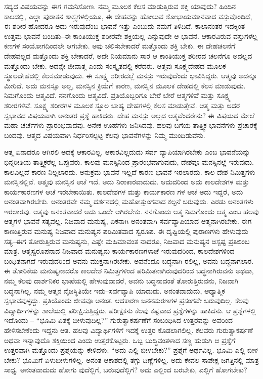 ಸದ್ಯದ ವಿಷಯವನ್ನು ಈಗ ಗಮನಿಸೋಣ. ನಮ್ಮ ಮೂಲಕ ಕೆಲಸ ಮಾಡುತ್ತಿರುವ ಶಕ್ತಿ ಯಾವುದು? ಹಿಂದಿನ ಕಾಲದಲ್ಲಿ, ಎಲ್ಲಾ ಪುರಾತನ ಶಾಸ್ತ್ರಗಳಲ್ಲಿಯೂ, ಈ ದೇಹವನ್ನು ಹೋಲುವ ಶೋಭಾಯಮಾನವಾದ ವಸ್ತುವೊಂದಿದೆ, ಈ ಶರೀರ ಹೋದರೂ ಅದು ಇರುವುದೆಂಬ ಭಾವನೆ ಇತ್ತು ಎಂಬುದು ನಮಗೆ ತಿಳಿದಿದೆ. ಕಾಲಾನಂತರ ಇದಕ್ಕಿಂತ ಉತ್ತಮ ಭಾವನೆ ಬಂದಿತು–ಈ ಕಾಂತಿಯುಕ್ತ ಶರೀರವೇ ಶಕ್ತಿಯಲ್ಲ ಎನ್ನುವುದೇ ಆ ಭಾವನೆ. ಆಕಾರವಿರುವ ವಸ್ತುಗಳೆಲ್ಲ ಕಣಗಳ ಸಂಯೋಗದಿಂದಲೇ ಆಗಬೇಕು. ಅವು ಚಲಿಸಬೇಕಾದರೆ ಮತ್ತೊಂದು ಶಕ್ತಿ ಬೇಕು. ಈ ದೇಹಚಲನೆಗೆ ದೇಹವಲ್ಲದ ಮತ್ತೊಂದು ಶಕ್ತಿ ಬೇಕಾದರೆ, ಅದೇ ನಿಯಮಾನು ಸಾರ ಆ ಕಾಂತಿಯುಕ್ತ ಶರೀರದ ಚಲನೆಗೂ ಅದಲ್ಲದ ಮತ್ತೊಂದು ಬೇಕು. ಅದನ್ನೇ ಜೀವಾತ್ಮ ಎಂದು ಸಂಸ್ಕೃತದಲ್ಲಿ ಕರೆದರು. ಆತ್ಮವು ಸೂಕ್ಷ್ಮದೇಹದ ಮೂಲಕ ಸ್ಥೂಲದೇಹದಲ್ಲಿ ಕೆಲಸಮಾಡುವುದು. ಈ ಸೂಕ್ಷ್ಮ ಶರೀರದಲ್ಲೆ ಮನಸ್ಸು ಇರುವುದೆಂದು ಭಾವಿಸಿದ್ದರು. ಆತ್ಮವು ಅದನ್ನೂ ಮೀರಿದೆ. ಅದು ಮನಸ್ಸೂ ಅಲ್ಲ, ಮನಸ್ಸಿನ ಕ್ರಿಯೆಗೆ ಕಾರಣ, ಮನಸ್ಸಿನ ಮೂಲಕ ದೇಹದಲ್ಲಿ ಕೆಲಸ ಮಾಡುವುದು. ನಿಮಗೊಂದು ಆತ್ಮವಿದೆ. ನನಗೊಂದು ಆತ್ಮವಿದೆ. ಪ್ರತಿಯೊಬ್ಬರಿಗೂ ಬೇರೆ ಬೇರೆ ಆತ್ಮಗಳಿವೆ ಮತ್ತು ಸೂಕ್ಷ್ಮ ಶರೀರಗಳಿವೆ. ಸೂಕ್ಷ್ಮ ಶರೀರಗಳ ಮೂಲಕ ಸ್ಥೂಲ ಬಾಹ್ಯ ದೇಹಗಳಲ್ಲಿ ಕೆಲಸ ಮಾಡುತ್ತೇವೆ. ಆತ್ಮ ಮತ್ತು ಅದರ ಸ್ವಭಾವದ ವಿಷಯವಾಗಿ ಅನಂತರ ಪ್ರಶ್ನೆ ಹಾಕಿದರು. ದೇಹ ಮನಸ್ಸು ಅಲ್ಲದ ಆತ್ಮವೆಂದರೇನು? ಈ ವಿಷಯದ ಮೇಲೆ ಮಹಾ ಚರ್ಚೆಗಳು ಪ್ರಾರಂಭವಾದವು. ಅನೇಕ ಊಹೆಗಳು ಜನಿಸಿದವು. ಹಲವು ಬಗೆಯ ತಾತ್ತ್ವಿಕ ಭಾವನೆಗಳು ಪ್ರಚಾರಕ್ಕೆ ಬಂದವು. ಆತ್ಮದ ವಿಷಯವಾಗಿ ನಿರ್ಧರಿಸಲ್ಪಟ್ಟ ಕೆಲವು ಭಾವನೆಗಳನ್ನು ನಿಮ್ಮ ಮುಂದಿಡುವೆನು.

ಆತ್ಮ ಏನಾದರೂ ಆಗಿರಲಿ ಅದಕ್ಕೆ ಆಕಾರವಿಲ್ಲ, ಆಕಾರವಿಲ್ಲದುದು ಸರ್ವ ವ್ಯಾಪಿಯಾಗಿರಬೇಕು ಎಂಬ ಭಾವನೆಯನ್ನು ಭಿನ್ನರೀತಿಯ ತಾತ್ತ್ವಿಕರೆಲ್ಲ ಒಪ್ಪುವರು. ಕಾಲವು ಮನಸ್ಸಿನಿಂದ ಪ್ರಾರಂಭವಾಗುವುದು, ದೇಶವೂ ಮನಸ್ಸಿನಲ್ಲೆ ಇರುವುದು. ಕಾಲವಿಲ್ಲದೆ ಕಾರಣ ನಿಲ್ಲಲಾರದು. ಅನುಕ್ರಮ ಭಾವನೆ ಇಲ್ಲದೆ ಕಾರಣ ಭಾವನೆ ಇರಲಾರದು. ಕಾಲ ದೇಶ ನಿಮಿತ್ತಗಳು ಮನಸ್ಸಿನಲ್ಲಿವೆ. ಆತ್ಮವು ಮನಸ್ಸಿನ ಆಚೆ ಇದೆ. ಅದು ನಿರಾಕಾರವಾದುದು. ಆದುದರಿಂದ ಅದು ಕಾಲದೇಶಗಳ ಮತ್ತು ಕಾರ್ಯಕಾರಣಗಳ ಆಚೆ ಇರಬೇಕಾಯಿತು. ಕಾಲದೇಶಗಳ ಮತ್ತು ಕಾರ್ಯಕಾರಣ ಗಳ ಆಚೆ ಅದು ಇದ್ದರೆ, ಅದು ಅನಂತವಾಗಿರಬೇಕು. ಅನಂತರವೇ ನಮ್ಮ ದರ್ಶನದಲ್ಲಿ ಮಹೋತ್ತುಂಗವಾದ ಕಲ್ಪನೆ ಬರುವುದು. ಎರಡು ಅನಂತಗಳು ಇರಲಾರವು. ಆತ್ಮವು ಅನಂತವಾದರೆ ಅದು ಒಂದೇ ಆಗಿರಬೇಕು. ನನಗೊಂದು ಆತ್ಮ ನಿಮಗೊಂದು ಆತ್ಮ ಎಂಬ ಹಲವು ಆತ್ಮಗಳ ಭಾವನೆ ಸತ್ಯವಲ್ಲ. ನಿಜವಾದ ಮನುಷ್ಯ, ಏಕನಾಗಿ ಅನಂತವಾಗಿ ಸರ್ವವ್ಯಾಪಿಯಾದ ಆತ್ಮನಾಗಿರಬೇಕು. ಈಗ ಕಾಣುತ್ತಿರುವ ಮನುಷ್ಯ ನಿಜವಾದ ಮನುಷ್ಯನ ಪರಿಮಿತವಾದ ಸ್ವರೂಪ. ಈ ದೃಷ್ಟಿಯಲ್ಲಿ ಪುರಾಣಗಳು ಹೇಳುವುದು ಸತ್ಯ–ಈಗ ತೋರುತ್ತಿರುವ ಮನುಷ್ಯನು, ಎಷ್ಟೇ ಮಹಿಮಾವಂತ ನಾದರೂ, ನಿಜವಾದ ಮನುಷ್ಯನ ಅಸ್ಪಷ್ಟ ಪ್ರತಿಬಿಂಬ ಮಾತ್ರ. ಆತ್ಮಸ್ವರೂಪನಾದ ನಿಜವಾದ ಮನುಷ್ಯನು ಕಾರ್ಯಕಾರಣಗಳಾಚೆ ಇರುವುದರಿಂದ, ಕಾಲದೇಶಗಳಿಂದ ಬಂಧಿತನಾಗದೆ ಇರುವುದರಿಂದ ಅವನು ಮುಕ್ತನಾಗಿರಬೇಕು. ಅವನೆಂದೂ ಬದ್ಧನಾಗಿ ರಲಿಲ್ಲ, ಅವನು ಬದ್ಧನಾಗಲಾರ. ಈ ತೋರಿಕೆಯ ಮನುಷ್ಯನಾದರೊ ಕಾಲದೇಶ ನಿಮಿತ್ತಗಳಿಂದ ಪರಿಮಿತನಾಗಿರುವುದರಿಂದ ಬದ್ಧನಾಗಿರುವನು ಅಥವಾ, ನಮ್ಮ ಕೆಲವು ದಾರ್ಶನಿಕರ ಭಾಷೆಯಲ್ಲಿ ಹೇಳುವುದಾದರೆ, ಅವನು ಬದ್ಧನಾದಂತೆ ತೋರುತ್ತಿರುವನು, ನಿಜವಾಗಿ ಬದ್ಧನಾಗಿಲ್ಲ. ನಮ್ಮ ಆತ್ಮನ ನೈಜಸ್ಥಿತಿಯೇ ಇದು–ಸರ್ವವ್ಯಾಪಿ ಯಾದುದು. ಅನಂತವಾದುದು, ಆಧ್ಯಾತ್ಮಿಕ ಸ್ವಭಾವವುಳ್ಳದ್ದು. ಪ್ರತಿಯೊಂದು ಜೀವವೂ ಅನಂತ. ಆದಕಾರಣ ಜನನಮರಣಗಳ ಪ್ರಸಂಗವೇ ಬರುವುದಿಲ್ಲ. ಕೆಲವು ವಿದ್ಯಾರ್ಥಿಗಳನ್ನು ಶಾಲೆಯಲ್ಲಿ ಪರೀಕ್ಷಿಸುತ್ತಿದ್ದರು. ಪರೀಕ್ಷಕನು ಕೆಲವು ಕಷ್ಟವಾದ ಪ್ರಶ್ನೆಗಳನ್ನು ಹಾಕಿದನು. ಆ ಪ್ರಶ್ನೆಗಳಲ್ಲಿ ಇದೊಂದು – “ಭೂಮಿ ಏತಕ್ಕೆ ಬೀಳುವುದಿಲ್ಲ?” ಗುರುತ್ವಾಕರ್ಷಣೆಗೆ ಸಂಬಂಧಿಸಿದ ಉತ್ತರವನ್ನು ಅವರಿಂದ ಹೇಳಿಸಬೇಕೆಂದು ಇದ್ದನು ಆತ. ಹಲವು ವಿದ್ಯಾರ್ಥಿಗಳಿಗೆ ಇದಕ್ಕೆ ಉತ್ತರ ಕೊಡಲಾಗಲಿಲ್ಲ. ಕೆಲವರು ಗುರುತ್ವಾಕರ್ಷಣೆ ಅಥವಾ ಇನ್ನಾವುದೊ ಶಕ್ತಿಯಿಂದ ಎಂದು ಉತ್ತರಕೊಟ್ಟರು. ಒಬ್ಬ ಬುದ್ಧಿವಂತಳಾದ ಸಣ್ಣ ಹುಡುಗಿ ಆ ಪ್ರಶ್ನೆಗೆ ಉತ್ತರವಾಗಿ ಮತ್ತೊಂದು ಪ್ರಶ್ನೆಯನ್ನು ಕೇಳಿದಳು: “ಅದು ಎಲ್ಲಿ ಬೀಳಬೇಕು?” ಪ್ರಶ್ನೆಗೆ ಅರ್ಥವಿಲ್ಲ. ಭೂಮಿ ಎಲ್ಲಿ ಬೀಳ ಬೇಕು? ಭೂಮಿಗೆ ಏಳುಬೀಳುಗಳಿಲ್ಲ. ಅನಂತ ಆಕಾಶದಲ್ಲಿ ತಗ್ಗು ದಿಣ್ಣೆಗಳಿಲ್ಲ. ಅದು ಕೇವಲ ಸಾಪೇಕ್ಷ ಜಗತ್ತಿನಲ್ಲಿ ಮಾತ್ರ ಸಾಧ್ಯ. ಅನಂತವಾದುದು ಹೋಗು ವುದೆಲ್ಲಿಗೆ, ಬರುವುದೆಲ್ಲಿಗೆ? ಅದು ಎಲ್ಲಿಂದ ಬರಬೇಕು, ಎಲ್ಲಿಗೆ ಹೋಗಬೇಕು?


